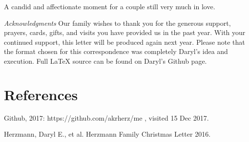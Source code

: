 \documentclass[letterpaper,11pt]{article}
\makeatletter
\def\refer{\par\noindent\hangindent\parindent\hangafter1}
\newenvironment{figurehere}
  {\def\@captype{figure}}
  {}
\makeatother
\begin{document}
\begin{multicols}{2}
\bigskip

\begin{figurehere}
 \centering   
 \caption{A candid and affectionate moment for a couple still very much in
 love.}
\end{figurehere}

\bigskip
  \emph{Acknowledgments} Our family wishes to thank you for the generous 
support, prayers, cards, gifts, and visits you have provided us in the past
year. With your continued support, this letter will be produced again
next year. Please note that the format chosen for this correspondence was
completely Daryl's idea and execution. Full \LaTeX\xspace source can be found on 
Daryl's Github page.

\section{References}

\refer Github, 2017: https://github.com/akrherz/me , visited 15 Dec 2017.
\refer Herzmann, Daryl E., et al. Herzmann Family Christmas Letter 2016. 

\end{multicols}
\end{document}
